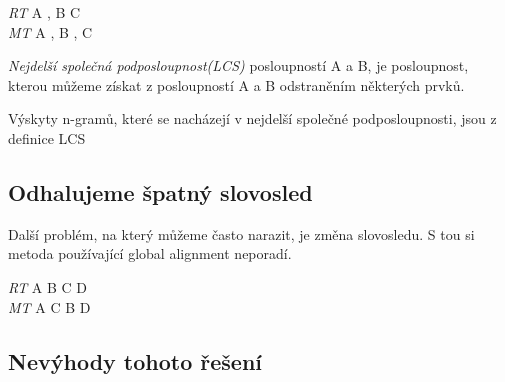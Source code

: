 \begin{example}
{\sl RT} A , B C\\
{\sl MT} A , B , C \\
\end{example}

\begin{define}
{\sl Nejdelší společná podposloupnost(LCS)} posloupností A a B, je posloupnost,
  kterou můžeme získat z posloupností A a B odstraněním některých prvků. 
\end{define}

Výskyty n-gramů, které se nacházejí v nejdelší společné podposloupnosti,
  jsou z definice LCS 

\subsection{Odhalujeme špatný slovosled}
Další problém, na který můžeme často narazit, je změna slovosledu.
S tou si metoda používající global alignment neporadí. 

\begin{example}
{\sl RT} A B C D \\
{\sl MT} A C B D \\
\end{example}

\subsection{Nevýhody tohoto řešení}

